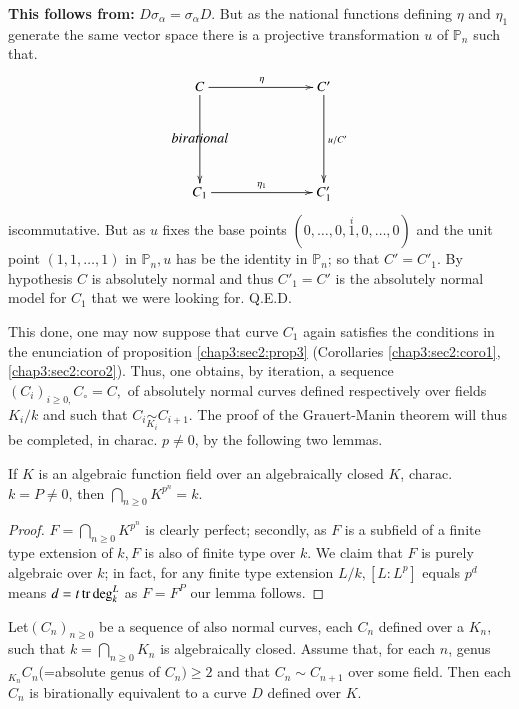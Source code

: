 \noindent
\textbf{This follows from:}  $D \sigma_\alpha  =\sigma_\alpha  D$. But
as the national functions defining $\eta$ and $\eta_1$ generate the
same vector space there is a projective transformation $u$ of
$\mathbb{P}_n$ such that. 
\[
\xymatrix@C=2cm{C\ar[dd] \ar[r]^\eta & C'\ar[dd]^{u/C'}\\
  birational &\\
  C_1 \ar[r]^{\eta_1} & C'_1
}
\]
is\pageoriginale commutative. But as  $u$ fixes the base points $(0,\ldots ,
0,\overset{i}{1},0,\ldots ,0) $ and the unit point $(1,1,\ldots,1)$ in
$\mathbb{P}_n, u$ has be the identity in $\mathbb{P}_n$; so that
$C'=C'_1$. By hypothesis $C$ is absolutely normal and thus $C'_1=C'$
is the  absolutely normal model for $C_1$ that we were looking
for. \hfill{ Q.E.D.} 

This done, one may now suppose that curve $ C_1$ again satisfies the
conditions in the enunciation of proposition \ref{chap3:sec2:prop3}
(Corollaries \ref{chap3:sec2:coro1}, \ref{chap3:sec2:coro2}). Thus, one obtains, by iteration,  a sequence $(C_i)_{i\geq 0,}
C_\circ =C,$ of absolutely normal curves defined respectively over
fields $K_i/k$ and such that $C_i \underset{K_{i}} {\sim}
C_{i+1}$. The proof of the Grauert-Manin theorem will thus be
completed, in charac. $p\neq 0$, by the following two lemmas. 

\begin{lemma}\label{chap3:sec2:lem4}%
  If $K$ is an algebraic function field over an algebraically closed
  $K$, charac. $k=P\neq 0$, then $\bigcap\limits_{n\geq 0}
  K^{p^n}=k$. 
\end{lemma}

\begin{proof}%
  $F=\bigcap\limits_{n\geq 0} K^{p^n}$ is clearly perfect; secondly,
  as $F$ is a subfield of a finite type extension of $k, F$ is also of
  finite type over $k$. We claim that $F$ is purely  algebraic over $k$;
  in fact, for any finite type extension $L/k,[L:L^p]$ equals $p^d$ means
  $d=t \operatorname{tr} \deg_k^L$ as $F=F^P$ our lemma follows. 
\end{proof}
 
\begin{lemma}\label{chap3:sec2:lem5}%
  Let\pageoriginale $(C_n)_{n\geq 0}$ be a sequence of also normal curves, each
  $C_n$ defined over a $K_n$, such 
  that $k=\bigcap\limits_{n\geq 0} K_n$ is algebraically
  closed. Assume that, for each $n$, genus$_{K_n} C_n$(=absolute genus of
  $C_n) \geq 2$ and that $C_n \sim C_{n+1}$ over some field. Then each
  $C_n$ is birationally equivalent to a curve $D$ defined over $K$. 
\end{lemma}

